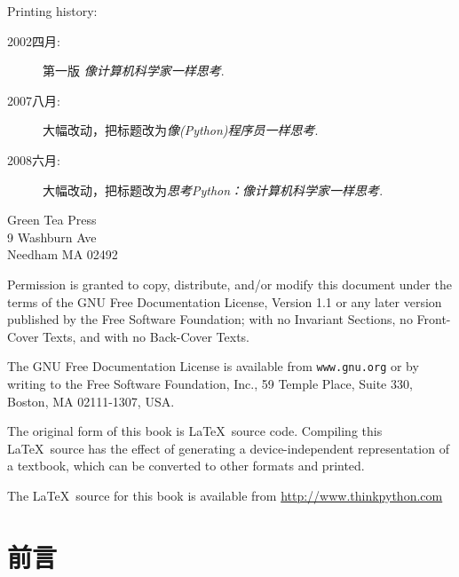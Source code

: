 \documentclass[10pt]{book}
\newcommand{\thetitle}{思考Python:像计算机科学家一样思考}
\newcommand{\theversion}{1.1.22}
\begin{document}
\begin{latexonly}
{Printing history:

\begin{description}

\item[2002四月:] 第一版 {\em 像计算机科学家一样思考}.
\item[2007八月:] 大幅改动，把标题改为{\em 像(Python)程序员一样思考}.
\item[2008六月:] 大幅改动，把标题改为{\em 思考Python：像计算机科学家一样思考}.
\end{description}

\vspace{0.2in}

\begin{flushleft}  %
Green Tea Press \\
9 Washburn Ave\\
Needham MA 02492
\end{flushleft}


Permission is granted to copy, distribute, and/or modify this document
under the terms of the GNU Free Documentation License, Version 1.1 or
any later version published by the Free Software Foundation; with no
Invariant Sections, no Front-Cover Texts, and with no Back-Cover Texts.

The GNU Free Documentation License is available from {\tt www.gnu.org}
or by writing to the Free Software Foundation, Inc., 59 Temple Place,
Suite 330, Boston, MA 02111-1307, USA.

The original form of this book is \LaTeX\ source code.  Compiling this
\LaTeX\ source has the effect of generating a device-independent
representation of a textbook, which can be converted to other formats
and printed.

The \LaTeX\ source for this book is available from
\url{http://www.thinkpython.com}
\vspace{0.2in}
}

\end{latexonly}


\begin{htmlonly}


{\Large \thetitle}
\{\Large  Allen B.Downet}
\{\Large  翻译:Walter Lewis}

Version \theversion

\setcounter{chapter}{-1}
\end{htmlonly}

\chapter{前言}
\end{document}
